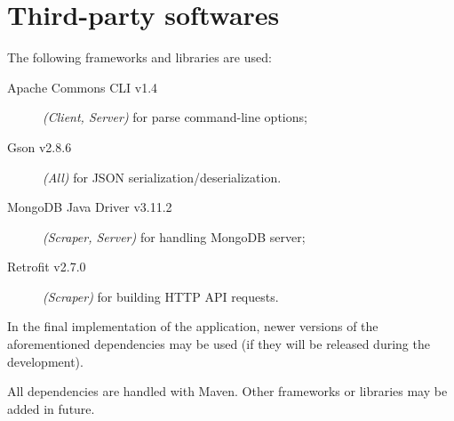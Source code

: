 \section{Third-party softwares}\label{sec:dependencies}

The following frameworks and libraries are used:
\begin{description}
	\item[Apache Commons CLI v1.4] \textit{(Client, Server)} for parse
		command-line options;
	\item[Gson v2.8.6] \textit{(All)} for JSON
		serialization/deserialization.
	\item[MongoDB Java Driver v3.11.2] \textit{(Scraper, Server)} for
		handling MongoDB server;
	\item[Retrofit v2.7.0] \textit{(Scraper)} for building HTTP API
		requests.
\end{description}

In the final implementation of the application, newer versions of the
aforementioned dependencies may be used (if they will be released during the
development).

All dependencies are handled with Maven. Other frameworks or libraries may be
added in future.
